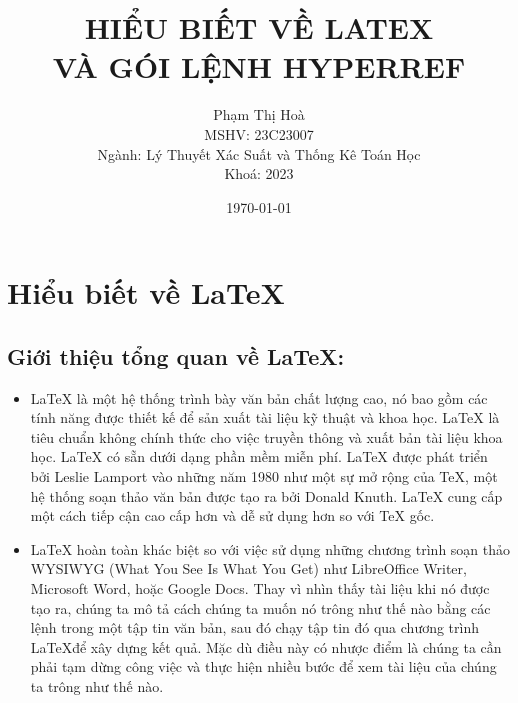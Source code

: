 \documentclass[a4paper,12pt]{article}
\title {HIỂU BIẾT VỀ LATEX\\ VÀ GÓI LỆNH HYPERREF}
\author{Phạm Thị Hoà\\
MSHV: 23C23007\\
Ngành: Lý Thuyết Xác Suất và Thống Kê Toán Học\\
Khoá: 2023
}
\date{\today}
\begin{document}
\maketitle

\tableofcontents

\newpage

\section {Hiểu biết về \LaTeX}
\subsection*{Giới thiệu tổng quan về \LaTeX:}
\begin{itemize}
	\item \LaTeX{} là một hệ thống trình bày văn bản chất lượng cao, nó bao gồm các tính năng được thiết kế để sản xuất tài liệu kỹ thuật và khoa học. \LaTeX{} là tiêu chuẩn không chính thức cho việc truyền thông và xuất bản tài liệu khoa học. \LaTeX{} có sẵn dưới dạng phần mềm miễn phí. \LaTeX{} được phát triển bởi Leslie Lamport vào những năm 1980 như một sự mở rộng của \TeX, một hệ thống soạn thảo văn bản được tạo ra bởi Donald Knuth. \LaTeX{} cung cấp một cách tiếp cận cao cấp hơn và dễ sử dụng hơn so với \TeX{} gốc.


	\item \LaTeX{} hoàn toàn khác biệt so với việc sử dụng những chương trình soạn thảo WYSIWYG (What You See Is What You Get) như LibreOffice Writer, Microsoft Word, hoặc Google Docs. Thay vì nhìn thấy tài liệu khi nó được tạo ra, chúng ta mô tả cách chúng ta muốn nó trông như thế nào bằng các lệnh trong một tập tin văn bản, sau đó chạy tập tin đó qua chương trình \LaTeX để xây dựng kết quả. Mặc dù điều này có nhược điểm là chúng ta cần phải tạm dừng công việc và thực hiện nhiều bước để xem tài liệu của chúng ta trông như thế nào.\newline
\end{itemize}
\end{document}
